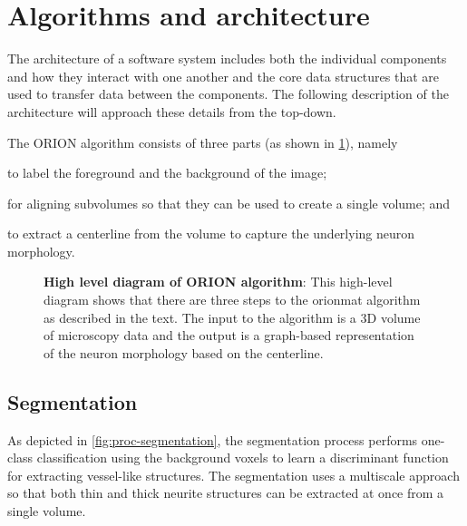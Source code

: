 \section{Algorithms and architecture}

The architecture of a software system includes both the individual
components and how they interact with one another and the core
data structures that are used to transfer data between the
components. The following description of the architecture will
approach these details from the top-down.

The ORION algorithm consists of three parts (as shown in \cref{fig:high-level-arch}),
namely
\begin{description}[font=\textpluscolon]
	\item[Segmentation] to label the
		foreground and the background of the image;
	\item[Registration] for aligning subvolumes so
		that they can be used to create a single volume;
		and
	\item[Tracing] to extract a centerline from the volume to
		capture the underlying neuron morphology.
\end{description}

\begin{figure}
\centering
\resizebox{1.0\textwidth}{!}{}
\caption[High level diagram of ORION algorithm]{\textbf{High level
diagram of ORION algorithm}: This high-level diagram shows that
there are three steps to the \gls{orionmat} algorithm as described
in the text. The input to the algorithm is a 3D volume of
microscopy data and the output is a graph-based representation of
the neuron morphology based on the centerline.}\label{fig:high-level-arch}
\end{figure}

\subsection{Segmentation}

As depicted in \cref{fig:proc-segmentation}, the
segmentation process performs one-class classification using the
background voxels to learn a discriminant function for extracting
vessel-like structures. The segmentation uses a multiscale approach so that
both thin and thick neurite structures can be extracted at once from a single
volume.

